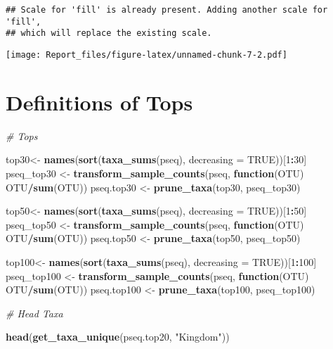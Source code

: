 \documentclass[]{article}
\newenvironment{Shaded}{\begin{snugshade}}{\end{snugshade}}
\newcommand{\CommentTok}[1]{\textcolor[rgb]{0.56,0.35,0.01}{\textit{#1}}}
\newcommand{\ControlFlowTok}[1]{\textcolor[rgb]{0.13,0.29,0.53}{\textbf{#1}}}
\newcommand{\DataTypeTok}[1]{\textcolor[rgb]{0.13,0.29,0.53}{#1}}
\newcommand{\DecValTok}[1]{\textcolor[rgb]{0.00,0.00,0.81}{#1}}
\newcommand{\KeywordTok}[1]{\textcolor[rgb]{0.13,0.29,0.53}{\textbf{#1}}}
\newcommand{\NormalTok}[1]{#1}
\newcommand{\OperatorTok}[1]{\textcolor[rgb]{0.81,0.36,0.00}{\textbf{#1}}}
\newcommand{\OtherTok}[1]{\textcolor[rgb]{0.56,0.35,0.01}{#1}}
\newcommand{\StringTok}[1]{\textcolor[rgb]{0.31,0.60,0.02}{#1}}
\begin{document}
\begin{verbatim}
## Scale for 'fill' is already present. Adding another scale for 'fill',
## which will replace the existing scale.
\end{verbatim}

\texttt{[image: Report\_files/figure-latex/unnamed-chunk-7-2.pdf]}

\hypertarget{definitions-of-tops}{%
\section{Definitions of Tops}\label{definitions-of-tops}}

\begin{Shaded}
\begin{Highlighting}[]
\CommentTok{# Tops}

\NormalTok{top30<-}\StringTok{ }\KeywordTok{names}\NormalTok{(}\KeywordTok{sort}\NormalTok{(}\KeywordTok{taxa_sums}\NormalTok{(pseq), }\DataTypeTok{decreasing =} \OtherTok{TRUE}\NormalTok{))[}\DecValTok{1}\OperatorTok{:}\DecValTok{30}\NormalTok{]}
\NormalTok{pseq_top30 <-}\StringTok{ }\KeywordTok{transform_sample_counts}\NormalTok{(pseq, }\ControlFlowTok{function}\NormalTok{(OTU) OTU}\OperatorTok{/}\KeywordTok{sum}\NormalTok{(OTU))}
\NormalTok{pseq.top30 <-}\StringTok{ }\KeywordTok{prune_taxa}\NormalTok{(top30, pseq_top30)}

\NormalTok{top50<-}\StringTok{ }\KeywordTok{names}\NormalTok{(}\KeywordTok{sort}\NormalTok{(}\KeywordTok{taxa_sums}\NormalTok{(pseq), }\DataTypeTok{decreasing =} \OtherTok{TRUE}\NormalTok{))[}\DecValTok{1}\OperatorTok{:}\DecValTok{50}\NormalTok{]}
\NormalTok{pseq_top50 <-}\StringTok{ }\KeywordTok{transform_sample_counts}\NormalTok{(pseq, }\ControlFlowTok{function}\NormalTok{(OTU) OTU}\OperatorTok{/}\KeywordTok{sum}\NormalTok{(OTU))}
\NormalTok{pseq.top50 <-}\StringTok{ }\KeywordTok{prune_taxa}\NormalTok{(top50, pseq_top50)}

\NormalTok{top100<-}\StringTok{ }\KeywordTok{names}\NormalTok{(}\KeywordTok{sort}\NormalTok{(}\KeywordTok{taxa_sums}\NormalTok{(pseq), }\DataTypeTok{decreasing =} \OtherTok{TRUE}\NormalTok{))[}\DecValTok{1}\OperatorTok{:}\DecValTok{100}\NormalTok{]}
\NormalTok{pseq_top100 <-}\StringTok{ }\KeywordTok{transform_sample_counts}\NormalTok{(pseq, }\ControlFlowTok{function}\NormalTok{(OTU) OTU}\OperatorTok{/}\KeywordTok{sum}\NormalTok{(OTU))}
\NormalTok{pseq.top100 <-}\StringTok{ }\KeywordTok{prune_taxa}\NormalTok{(top100, pseq_top100)}

\CommentTok{# Head Taxa}

\KeywordTok{head}\NormalTok{(}\KeywordTok{get_taxa_unique}\NormalTok{(pseq.top20, }\StringTok{"Kingdom"}\NormalTok{))}
\end{Highlighting}
\end{Shaded}
\end{document}
